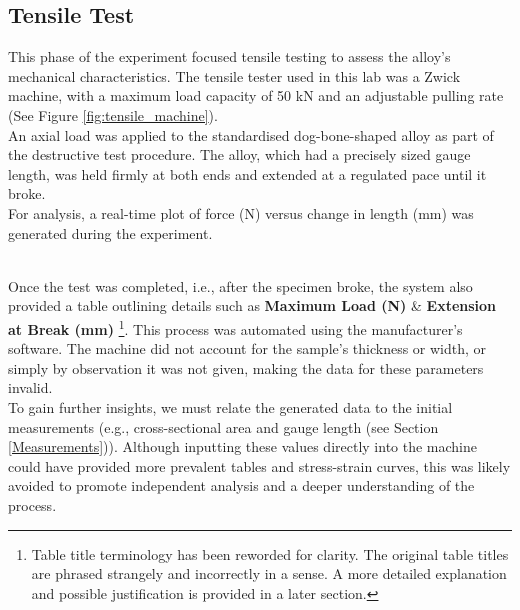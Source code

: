 \documentclass{article}
\begin{document}
\begin{minipage}{0.555\textwidth}
\subsection{Tensile Test}
This phase of the experiment focused tensile testing to assess the alloy's mechanical characteristics. The tensile tester used in this lab was a {Zwick machine}, with a maximum load capacity of 50 kN and an adjustable pulling rate (See Figure \ref{fig:tensile_machine}).\\[8pt]
An axial load was applied to the standardised dog-bone-shaped alloy as part of the destructive test procedure. The alloy, which had a precisely sized gauge length, was held firmly at both ends and extended at a regulated pace until it broke.\\[8pt]
For analysis, a real-time plot of force (N) versus change in length (mm) was generated during the experiment.
\end{minipage}\\[8pt]
Once the test was completed, i.e., after the specimen broke, the system also provided a table outlining details such as \textbf{Maximum Load (N)} \& \textbf{Extension at Break (mm)} \footnote{Table title terminology has been reworded for clarity. The original table titles are phrased strangely and incorrectly in a sense. A more detailed explanation and possible justification is provided in a later section.}. This process was automated using the manufacturer's software. The machine did not account for the sample's thickness or width, or simply by observation it was not given, making the data for these parameters invalid.\\[8pt]
To gain further insights, we must relate the generated data to the initial measurements (e.g., cross-sectional area and gauge length (see Section \ref{Measurements})). Although inputting these values directly into the machine could have provided more prevalent tables and stress-strain curves, this was likely avoided to promote independent analysis and a deeper understanding of the process.
\end{document}
